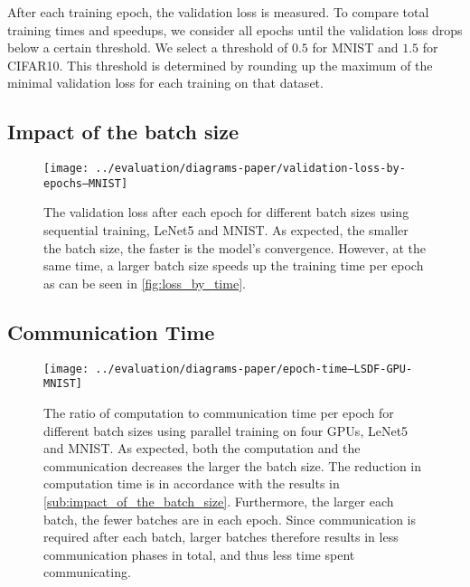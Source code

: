 \documentclass[conference,compsoc,a4paper]{IEEEtran}
\begin{document}
After each training epoch, the validation loss is measured.
To compare total training times and speedups, we consider all epochs until the validation loss drops below a certain threshold.
We select a threshold of $0.5$ for MNIST and $1.5$ for CIFAR10.
This threshold is determined by rounding up the maximum of the minimal validation loss for each training on that dataset.


\subsection{Impact of the batch size} %
\label{sub:impact_of_the_batch_size}

\begin{figure}[h]
\centering
\texttt{[image: ../evaluation/diagrams-paper/validation-loss-by-epochs--MNIST]}
\caption{The validation loss after each epoch for different batch sizes using sequential training, LeNet5 and MNIST.
As expected, the smaller the batch size, the faster is the model's convergence.
However, at the same time, a larger batch size speeds up the training time per epoch as can be seen in \autoref{fig:loss_by_time}.}
\label{fig:loss_by_epoch}
\end{figure}


\subsection{Communication Time} %
\label{sub:communication_time}

\begin{figure}[h]
\centering
\texttt{[image: ../evaluation/diagrams-paper/epoch-time--LSDF-GPU-MNIST]}
\caption{The ratio of computation to communication time per epoch for different batch sizes using parallel training on four GPUs, LeNet5 and MNIST.
As expected, both the computation and the communication decreases the larger the batch size.
The reduction in computation time is in accordance with the results in \autoref{sub:impact_of_the_batch_size}.
Furthermore, the larger each batch, the fewer batches are in each epoch.
Since communication is required after each batch, larger batches therefore results in less communication phases in total, and thus less time spent communicating.}
\label{fig:comm_time_by_batch_size}
\end{figure}
\end{document}
